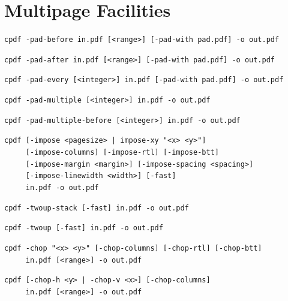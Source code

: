 \documentclass{book}
\begin{document}
\chapter{Multipage Facilities}\pagestyle{fancy}\label{multipage}\label{chap:9}
  \begin{framed}
    \small\noindent\verb!cpdf -pad-before in.pdf [<range>] [-pad-with pad.pdf] -o out.pdf!

    \vspace{1.5mm}
    \small\noindent\verb!cpdf -pad-after in.pdf [<range>] [-pad-with pad.pdf] -o out.pdf!

    \vspace{1.5mm}
    \small\noindent\verb!cpdf -pad-every [<integer>] in.pdf [-pad-with pad.pdf] -o out.pdf!

    \vspace{1.5mm}
    \small\noindent\verb!cpdf -pad-multiple [<integer>] in.pdf -o out.pdf!

    \vspace{1.5mm}
    \small\noindent\verb!cpdf -pad-multiple-before [<integer>] in.pdf -o out.pdf!

    \vspace{1.5mm}
    \small\noindent\verb!cpdf [-impose <pagesize> | impose-xy "<x> <y>"]!\\
    \small\noindent\verb!     [-impose-columns] [-impose-rtl] [-impose-btt]!\\
    \small\noindent\verb!     [-impose-margin <margin>] [-impose-spacing <spacing>]!\\
    \small\noindent\verb!     [-impose-linewidth <width>] [-fast]!\\
    \small\noindent\verb!     in.pdf -o out.pdf!

    \vspace{1.5mm}
    \small\noindent\verb!cpdf -twoup-stack [-fast] in.pdf -o out.pdf! 

    \vspace{1.5mm}
    \small\noindent\verb!cpdf -twoup [-fast] in.pdf -o out.pdf!

    \vspace{1.5mm}
    \small\noindent\verb!cpdf -chop "<x> <y>" [-chop-columns] [-chop-rtl] [-chop-btt]!\\
    \small\noindent\verb!     in.pdf [<range>] -o out.pdf!

    \vspace{1.5mm}
    \small\noindent\verb!cpdf [-chop-h <y> | -chop-v <x>] [-chop-columns]!\\
    \small\noindent\verb!     in.pdf [<range>] -o out.pdf!
  \end{framed}
\end{document}
